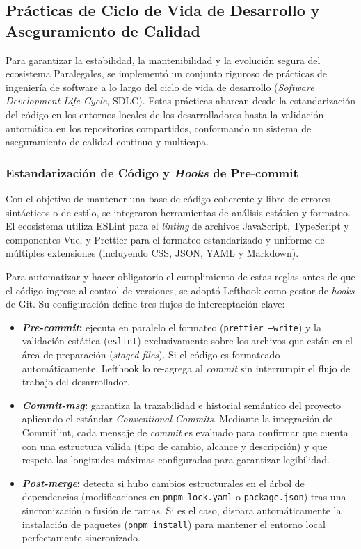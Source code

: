 \subsection{Prácticas de Ciclo de Vida de Desarrollo y Aseguramiento de Calidad}\label{subsec:sdlc}

Para garantizar la estabilidad, la mantenibilidad y la evolución segura del ecosistema Paralegales, se implementó un conjunto riguroso de prácticas de ingeniería de software a lo largo del ciclo de vida de desarrollo (\textit{Software Development Life Cycle}, SDLC). Estas prácticas abarcan desde la estandarización del código en los entornos locales de los desarrolladores hasta la validación automática en los repositorios compartidos, conformando un sistema de aseguramiento de calidad continuo y multicapa.

\subsubsection{Estandarización de Código y \textit{Hooks} de Pre-commit}

Con el objetivo de mantener una base de código coherente y libre de errores sintácticos o de estilo, se integraron herramientas de análisis estático y formateo. El ecosistema utiliza ESLint para el \textit{linting} de archivos JavaScript, TypeScript y componentes Vue, y Prettier para el formateo estandarizado y uniforme de múltiples extensiones (incluyendo CSS, JSON, YAML y Markdown).

Para automatizar y hacer obligatorio el cumplimiento de estas reglas antes de que el código ingrese al control de versiones, se adoptó Lefthook como gestor de \textit{hooks} de Git. Su configuración define tres flujos de interceptación clave:

\begin{itemize}
  \item \textbf{\textit{Pre-commit}:} ejecuta en paralelo el formateo (\texttt{prettier --write}) y la validación estática (\texttt{eslint}) exclusivamente sobre los archivos que están en el área de preparación (\textit{staged files}). Si el código es formateado automáticamente, Lefthook lo re-agrega al \textit{commit} sin interrumpir el flujo de trabajo del desarrollador.

  \item \textbf{\textit{Commit-msg}:} garantiza la trazabilidad e historial semántico del proyecto aplicando el estándar \textit{Conventional Commits}. Mediante la integración de Commitlint, cada mensaje de \textit{commit} es evaluado para confirmar que cuenta con una estructura válida (tipo de cambio, alcance y descripción) y que respeta las longitudes máximas configuradas para garantizar legibilidad.

  \item \textbf{\textit{Post-merge}:} detecta si hubo cambios estructurales en el árbol de dependencias (modificaciones en \texttt{pnpm-lock.yaml} o \texttt{package.json}) tras una sincronización o fusión de ramas. Si es el caso, dispara automáticamente la instalación de paquetes (\texttt{pnpm install}) para mantener el entorno local perfectamente sincronizado.
\end{itemize}

